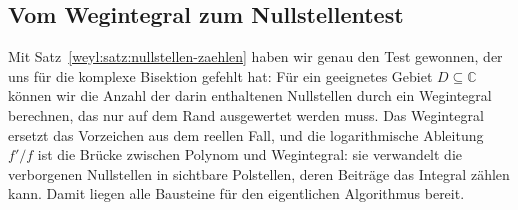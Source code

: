 \subsection{Vom Wegintegral zum Nullstellentest%
\label{weyl:subsection:zusammenfassung-grundlagen}}
%
Mit Satz~\ref{weyl:satz:nullstellen-zaehlen} haben wir genau den Test gewonnen, der uns für die
komplexe Bisektion gefehlt hat: Für ein geeignetes Gebiet $D \subseteq \mathbb{C}$
können wir die Anzahl der darin enthaltenen Nullstellen durch ein Wegintegral
berechnen, das nur auf dem Rand ausgewertet werden muss.
Das Wegintegral ersetzt das Vorzeichen aus dem reellen Fall, und die logarithmische
Ableitung $f'/f$ ist die Brücke zwischen Polynom und Wegintegral: sie verwandelt die
verborgenen Nullstellen in sichtbare Polstellen, deren Beiträge das Integral zählen
kann.
Damit liegen alle Bausteine für den eigentlichen Algorithmus bereit.

